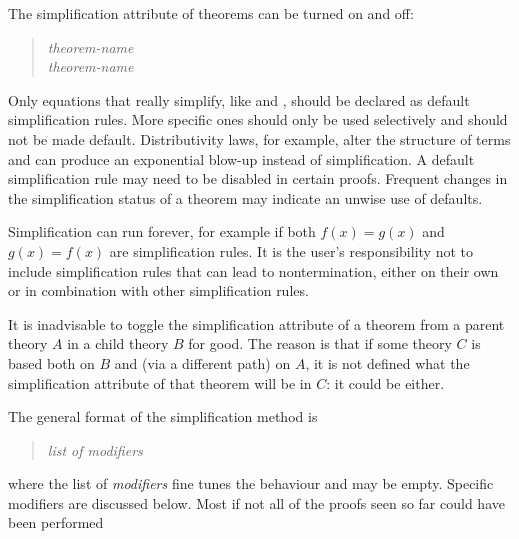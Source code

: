 \begin{isabellebody}
\begin{isamarkuptext}
The simplification attribute of theorems can be turned on and off:%
\begin{quote}
 \textit{theorem-name}\\
 \textit{theorem-name}
\end{quote}
Only equations that really simplify, like  and
, should be declared as default simplification rules. 
More specific ones should only be used selectively and should
not be made default.  Distributivity laws, for example, alter
the structure of terms and can produce an exponential blow-up instead of
simplification.  A default simplification rule may
need to be disabled in certain proofs.  Frequent changes in the simplification
status of a theorem may indicate an unwise use of defaults.
\begin{warn}
  Simplification can run forever, for example if both $f(x) = g(x)$ and
  $g(x) = f(x)$ are simplification rules. It is the user's responsibility not
  to include simplification rules that can lead to nontermination, either on
  their own or in combination with other simplification rules.
\end{warn}
\begin{warn}
  It is inadvisable to toggle the simplification attribute of a
  theorem from a parent theory $A$ in a child theory $B$ for good.
  The reason is that if some theory $C$ is based both on $B$ and (via a
  different path) on $A$, it is not defined what the simplification attribute
  of that theorem will be in $C$: it could be either.
\end{warn}%
\end{isamarkuptext}%
\isamarkuptrue%
%
\isamarkuptrue%
%
\begin{isamarkuptext}%
The general format of the simplification method is
\begin{quote}
\isa{simp} \textit{list of modifiers}
\end{quote}
where the list of \emph{modifiers} fine tunes the behaviour and may
be empty. Specific modifiers are discussed below.  Most if not all of the
proofs seen so far could have been performed

\end{isamarkuptext}
\end{isabellebody}
